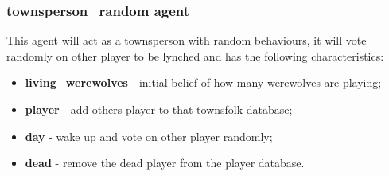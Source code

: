 \documentclass{article}
\begin{document}
\subsubsection{townsperson\_random agent}
This agent will act as a townsperson with random behaviours, it will vote randomly on other player to be lynched and has the following characteristics:
\begin{itemize}
	\item \textbf{living\_werewolves} - initial belief of how many werewolves are playing; 
	\item \textbf{player} - add others player to that townsfolk database;
	\item \textbf{day} - wake up and vote on other player randomly;
	\item \textbf{dead} - remove the dead player from the player database.
\end{itemize}
\end{document}
